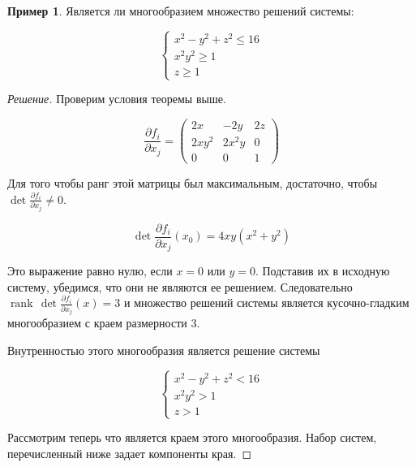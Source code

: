 \documentclass[a5paper]{article}
\newcounter{through}
\theoremstyle{plain}
\theoremstyle{definition}
\newtheorem{example}[through]{Пример}
\numberwithin{through}{section}
\numberwithin{equation}{section}
\DeclareMathOperator{\rank}{rank}
\begin{document}
\begin{example}
	Является ли многообразием множество решений системы:
	
	\begin{equation*}
		\begin{cases}
			x^2 - y^2 + z^2 \leq 16 \\
			x^2 y^2 \geq 1 \\
			z \geq 1
		\end{cases}
	\end{equation*}
\end{example}
\begin{proof}[Решение]
	Проверим условия теоремы выше.
	
	\begin{equation*}
		\frac{\partial f_i}{\partial x_j} = 
		\begin{pmatrix}
			2x & -2y & 2z \\
			2xy^2 & 2x^{2}y & 0 \\
			0 & 0 & 1
		\end{pmatrix}
	\end{equation*}
	
	Для того чтобы ранг этой матрицы был максимальным, достаточно, чтобы $\det \frac{\partial f_i}{\partial x_j} \not= 0$.
	
	\begin{equation*}
		\det \frac{\partial f_i}{\partial x_j} (x_0) = 4xy(x^2 + y^2)
	\end{equation*}
	
	Это выражение равно нулю, если $x=0$ или $y=0$. Подставив их в исходную систему, убедимся, что они не являются ее решением. Следовательно $\rank \, \det \frac{\partial f_i}{\partial x_j} (x) = 3$ и множество решений системы является кусочно-гладким многообразием с краем размерности $3$.
	
	Внутренностью этого многообразия является решение системы
	
	\begin{equation*}
		\begin{cases}
		x^2 - y^2 + z^2 < 16 \\
		x^2 y^2 > 1 \\
		z > 1
		\end{cases} 
	\end{equation*}
	
	Рассмотрим теперь что является краем этого многообразия. Набор систем, перечисленный ниже задает компоненты края.
	

\end{proof}
\end{document}

